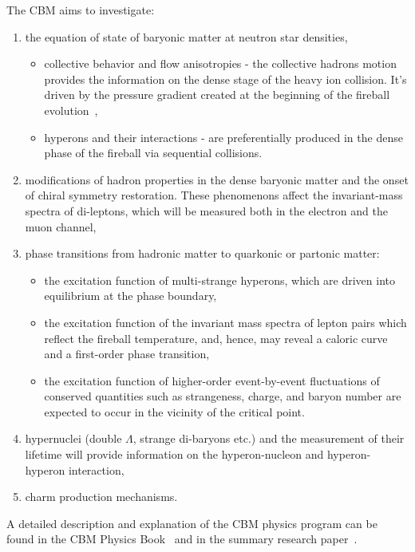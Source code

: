 The \gls{CBM} aims to investigate:
\begin{enumerate}
    \item the equation of state of baryonic matter at neutron star densities,
    \begin{itemize}
        \item collective behavior and flow anisotropies - the collective hadrons motion provides the information on the dense stage of the heavy ion collision. It's driven by the pressure gradient created at the beginning of the fireball evolution~\cite{Reisdorf_2007},
        \item hyperons and their interactions - are preferentially produced in the dense phase of the fireball via sequential collisions.
    \end{itemize}
    \item modifications of hadron properties in the dense baryonic matter and the onset of chiral symmetry restoration. These phenomenons affect the invariant-mass spectra of di-leptons, which will be measured both in the electron and the muon channel,
    \item phase transitions from hadronic matter to quarkonic or partonic matter:
    \begin{itemize}
        \item the excitation function of multi-strange hyperons, which are driven into equilibrium at the phase boundary,
        \item the excitation function of the invariant mass spectra of lepton pairs which reflect the fireball temperature, and, hence, may reveal a caloric curve and a first-order phase transition,
        \item the excitation function of higher-order event-by-event fluctuations of conserved quantities such as strangeness, charge, and baryon number are expected to occur in the vicinity of the critical point.
    \end{itemize}

     
     
    \item hypernuclei (double $\Lambda$, strange di-baryons etc.) and the measurement of their lifetime will provide information on the hyperon-nucleon and hyperon-hyperon interaction,
    \item charm production mechanisms.
\end{enumerate}
A detailed description and explanation of the \gls{CBM} physics program can be found in the \gls{CBM} Physics Book~\cite{CBM_physics} and in the summary research paper~\cite{Ablyazimov_2017}.



